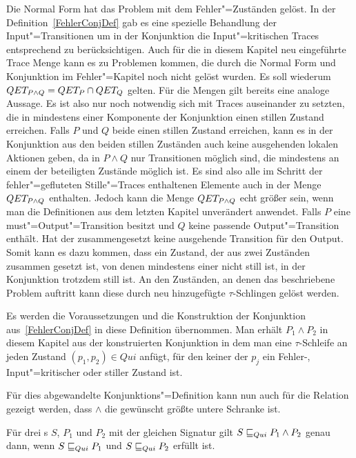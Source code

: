 Die Normal Form hat das Problem mit dem Fehler"=Zuständen gelöst. In der
Definition~\ref{FehlerConjDef} gab es eine spezielle Behandlung der
Input"=Transitionen um in der Konjunktion die Input"=kritischen Traces
entsprechend zu berücksichtigen. Auch für die in diesem Kapitel neu eingeführte
Trace Menge \QET{} kann es zu Problemen kommen, die durch die Normal Form und
Konjunktion im Fehler"=Kapitel noch nicht gelöst wurden. Es soll wiederum $QET
_{P\land Q} = QET _P \cap QET _Q$ gelten. Für die \ET{} Mengen gilt bereits
eine analoge Aussage. Es ist also nur noch notwendig sich mit Traces
auseinander zu setzten, die in mindestens einer Komponente der Konjunktion
einen stillen Zustand erreichen. Falls $P$ und $Q$ beide einen stillen Zustand
erreichen, kann es in der Konjunktion aus den beiden stillen Zuständen auch
keine ausgehenden lokalen Aktionen geben, da in $P\land Q$ nur Transitionen
möglich sind, die mindestens an einem der beteiligten Zustände möglich ist. Es
sind also alle im Schritt der fehler"=gefluteten Stille"=Traces enthaltenen
Elemente auch in der Menge $QET _{P\land Q}$ enthalten. Jedoch kann die Menge
$QET _{P\land Q}$ echt größer sein, wenn man die Definitionen aus dem letzten
Kapitel unverändert anwendet. Falls $P$ eine must"=Output"=Transition besitzt
und $Q$ keine passende Output"=Transition enthält. Hat der zusammengesetzt
keine ausgehende Transition für den Output. Somit kann es dazu kommen, dass ein
Zustand, der aus zwei Zuständen zusammen gesetzt ist, von denen mindestens
einer nicht still ist, in der Konjunktion trotzdem still ist. An den Zuständen,
an denen das beschriebene Problem auftritt kann diese durch neu hinzugefügte
$\tau$-Schlingen gelöst werden.

\begin{Def}[Konjunktion]
  Es werden die Voraussetzungen und die Konstruktion der Konjunktion
  aus~\ref{FehlerConjDef} in diese Definition übernommen. Man erhält $P_1\land
  P_2$ in diesem Kapitel aus der konstruierten Konjunktion in dem man eine
  $\tau$-Schleife an jeden Zustand $(p_1,p_2)\in Qui$ anfügt, für den keiner
  der $p_j$ ein Fehler-, Input"=kritischer oder stiller Zustand ist.
\end{Def}

Für dies abgewandelte Konjunktions"=Definition kann nun auch für die Relation
\QRel{} gezeigt werden, dass $\land$ die gewünscht größte untere Schranke ist.

\begin{Satz}[Konjunktion]
  Für drei \MEIO{}s $S$, $P_1$ und $P_2$ mit der gleichen Signatur gilt $S \sqsubseteq  _{Qui}
  P_1\land P_2$ genau dann, wenn $S \sqsubseteq  _{Qui} P_1$ und $S \sqsubseteq  _{Qui} P_2$ erfüllt ist.
\end{Satz}

